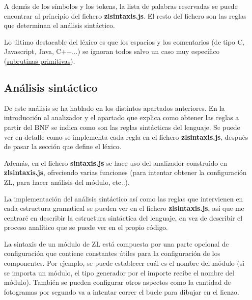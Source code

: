 \documentclass{report}
\begin{document}
	A demás de los símbolos y los tokens, la lista de palabras reservadas se puede encontrar al principio del fichero \textbf{zlsintaxis.js}. El resto del fichero son las reglas que determinan el análisis sintáctico.
	
	\vspace{10px}
	
	Lo último destacable del léxico es que los espacios y los comentarios (de tipo C, Javascript, Java, C++...) se ignoran todos salvo un caso muy específico (\hyperref[subrutinasprimitivas]{subrutinas primitivas}).
	
	\subsection{Análisis sintáctico}
	
	De este análisis se ha hablado en los distintos apartados anteriores. En la introducción al analizador y el apartado que explica como obtener las reglas a partir del BNF se indica como son las reglas sintácticas del lenguaje. Se puede ver en detalle como se implementa cada regla en el fichero \textbf{zlsintaxis.js}, después de pasar la sección que define el léxico. 
	
	\vspace{10px}
	
	Además, en el fichero \textbf{sintaxis.js} se hace uso del analizador construido en \textbf{zlsintaxis.js}, ofreciendo varias funciones (para intentar obtener la configuración ZL, para hacer análisis del módulo, etc..).
	
	\vspace{10px}
	
	La implementación del análisis sintáctico así como las reglas que intervienen en cada estructura gramatical se pueden ver en el fichero \textbf{zlsintaxis.js}, así que me centraré en describir la estructura sintáctica del lenguaje, en vez de describir el proceso analítico que se puede ver en el propio código.
	
	\vspace{10px}
	
	La sintaxis de un módulo de ZL está compuesta por una parte opcional de configuración que contiene constantes útiles para la configuración de los componentes. Por ejemplo, se puede establecer cuál es el nombre del módulo (si se importa un módulo, el tipo generador por el importe recibe el nombre del módulo). También se pueden configurar otros aspectos como la cantidad de fotogramas por segundo va a intentar correr el bucle para dibujar en el lienzo. 
	
\end{document}
